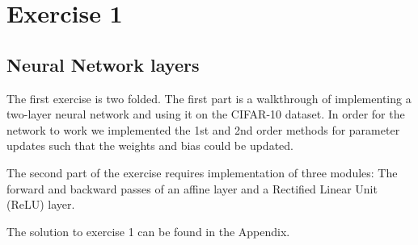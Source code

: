 \graphicspath{{Chapters/Exercise1/}}

\chapter{Exercise 1}

\section{Neural Network layers} %
\label{sec:Neural_Networ_layers}


The first exercise is two folded. The first part is a walkthrough of
implementing a two-layer neural network and using it on the CIFAR-10 dataset. In
order for the network to work we implemented the 1st and 2nd order methods for
parameter updates such that the weights and bias could be updated. 

The second part of the exercise requires implementation of three modules: The
forward and backward passes of an affine layer and a Rectified Linear Unit
(ReLU) layer.  

The solution to exercise 1 can be found in the Appendix. 


